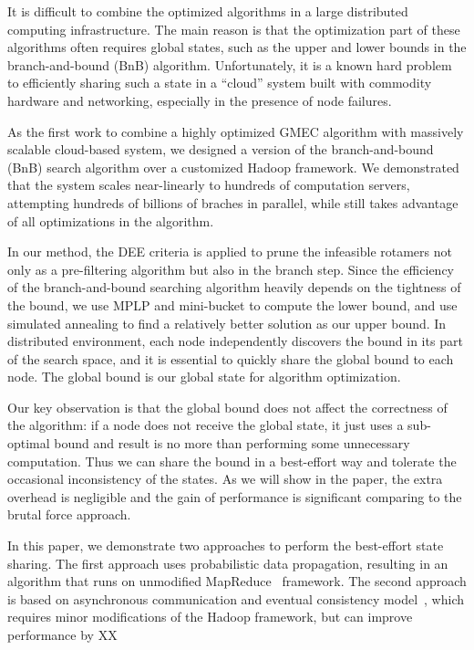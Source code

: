 It is difficult to combine the optimized algorithms in a large distributed
computing infrastructure. The main reason is that the optimization part of these
algorithms often requires global states, such as the upper and lower bounds in
the branch-and-bound (BnB) algorithm. Unfortunately, it is a known hard problem
to efficiently sharing such a state in a ``cloud'' system built with commodity
hardware and networking, especially in the presence of node failures.

As the first work to combine a highly optimized GMEC algorithm with massively
scalable cloud-based system, we designed a version of the branch-and-bound (BnB)
search algorithm over a customized Hadoop framework. We demonstrated that the
system scales near-linearly to hundreds of computation servers, attempting
hundreds of billions of braches in parallel, while still takes advantage of all
optimizations in the algorithm.

In our method, the DEE criteria is applied to prune
the infeasible rotamers not only as a pre-filtering algorithm but also in the
branch step. Since the efficiency of the branch-and-bound searching algorithm
heavily depends on the tightness of the bound, we use MPLP
\cite[]{globerson2008fixing} and mini-bucket \cite[]{rollon2010evaluating} to
compute the lower bound, and use simulated annealing to find a
relatively better solution as our upper bound. In distributed environment, each node
independently discovers the bound in its part of the search space, and it is
essential to quickly share the global bound to each node. The global bound is
our global state for algorithm optimization.

Our key observation is that the global bound does not affect the correctness of
the algorithm: if a node does not receive the global state, it just uses a
sub-optimal bound and result is no more than performing some unnecessary
computation. Thus we can share the bound in a best-effort way and tolerate the
occasional inconsistency of the states. As we will show in the paper, the extra
overhead is negligible and the gain of performance is significant comparing to
the brutal force approach.

In this paper, we demonstrate two approaches to perform the best-effort state
sharing. The first approach uses probabilistic data propagation, resulting in an
algorithm that runs on unmodified MapReduce~\cite[]{} framework. The second
approach is based on asynchronous communication and eventual consistency
model~\cite[]{}, which requires minor modifications of the Hadoop framework, but
can improve performance by XX%


